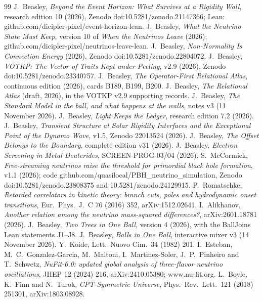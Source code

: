 \documentclass[11pt]{article}
\theoremstyle{definition}\newtheorem{hypothesis}{Hypothesis}\newtheorem{prediction}{Prediction}
\theoremstyle{remark}\newtheorem{remark}[theorem]{Remark}
\begin{document}
\begin{thebibliography}{99}\small
{} J.~Beasley, \emph{Beyond the Event Horizon: What Survives at a Rigidity Wall}, research edition 10 (2026), Zenodo doi:10.5281/zenodo.21147366; Lean: github.com/dicipler-pixel/event-horizon-lean.
 J.~Beasley, \emph{What the Neutrino State Must Keep}, version 10 of \emph{When the Neutrinos Leave} (2026); github.com/dicipler-pixel/neutrinos-leave-lean.
 J.~Beasley, \emph{Non-Normality Is Connection Energy} (2026), Zenodo doi:10.5281/zenodo.22804072.
 J.~Beasley, \emph{VOTKP: The Vector of Traits Kept under Peeling}, v2.9 (2026), Zenodo doi:10.5281/zenodo.23340757.
 J.~Beasley, \emph{The Operator-First Relational Atlas}, continuous edition (2026), cards B189, B199, B200.
 J.~Beasley, \emph{The Relational Atlas} (draft, 2026), in the VOTKP v2.9 supporting records.
 J.~Beasley, \emph{The Standard Model in the ball, and what happens at the walls}, notes v3 (11 November 2026).
 J.~Beasley, \emph{Light Keeps the Ledger}, research edition 7.2 (2026).
 J.~Beasley, \emph{Transient Structure at Solar Rigidity Interfaces and the Exceptional Point of the Dynamo Wave}, v1.5, Zenodo 22013524 (2026).
 J.~Beasley, \emph{The Offset Belongs to the Boundary}, complete edition v31 (2026).
 J.~Beasley, \emph{Electron Screening in Metal Deuterides}, SCREEN-PROG-03/04 (2026).
 S.~McCormick, \emph{Free-streaming neutrinos raise the threshold for primordial black hole formation}, v1.1 (2026); code github.com/quasilocal/PBH\_neutrino\_simulation, Zenodo doi:10.5281/zenodo.23808375 and 10.5281/zenodo.24129915.
 P.~Romatschke, \emph{Retarded correlators in kinetic theory: branch cuts, poles and hydrodynamic onset transitions}, Eur.\ Phys.\ J.\ C 76 (2016) 352, arXiv:1512.02641.
 I.~Alikhanov, \emph{Another relation among the neutrino mass-squared differences?}, arXiv:2601.18781 (2026).
 J.~Beasley, \emph{Two Trees in One Ball}, version 4 (2026), with the BallJoins Lean statements J1--J8.
 J.~Beasley, \emph{Balls in One Ball}, interactive mixer v3 (14 November 2026).
 Y.~Koide, Lett.\ Nuovo Cim.\ 34 (1982) 201.
 I.~Esteban, M.~C.~Gonzalez-Garcia, M.~Maltoni, I.~Martinez-Soler, J.~P.~Pinheiro and T.~Schwetz, \emph{NuFit-6.0: updated global analysis of three-flavor neutrino oscillations}, JHEP 12 (2024) 216, arXiv:2410.05380; www.nu-fit.org.
 L.~Boyle, K.~Finn and N.~Turok, \emph{CPT-Symmetric Universe}, Phys.\ Rev.\ Lett.\ 121 (2018) 251301, arXiv:1803.08928.

\end{thebibliography}
\end{document}
